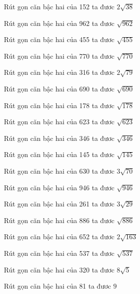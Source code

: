 \documentclass[12pt,a4paper]{article}
\begin{document}
\begin{ex}
Rút gọn căn bậc hai của 152 ta đươc $2\sqrt{38}$
\end{ex}
\begin{ex}
Rút gọn căn bậc hai của 962 ta đươc $\sqrt{962}$
\end{ex}
\begin{ex}
Rút gọn căn bậc hai của 455 ta đươc $\sqrt{455}$
\end{ex}
\begin{ex}
Rút gọn căn bậc hai của 770 ta đươc $\sqrt{770}$
\end{ex}
\begin{ex}
Rút gọn căn bậc hai của 316 ta đươc $2\sqrt{79}$
\end{ex}
\begin{ex}
Rút gọn căn bậc hai của 690 ta đươc $\sqrt{690}$
\end{ex}
\begin{ex}
Rút gọn căn bậc hai của 178 ta đươc $\sqrt{178}$
\end{ex}
\begin{ex}
Rút gọn căn bậc hai của 623 ta đươc $\sqrt{623}$
\end{ex}
\begin{ex}
Rút gọn căn bậc hai của 346 ta đươc $\sqrt{346}$
\end{ex}
\begin{ex}
Rút gọn căn bậc hai của 145 ta đươc $\sqrt{145}$
\end{ex}
\begin{ex}
Rút gọn căn bậc hai của 630 ta đươc $3\sqrt{70}$
\end{ex}
\begin{ex}
Rút gọn căn bậc hai của 946 ta đươc $\sqrt{946}$
\end{ex}
\begin{ex}
Rút gọn căn bậc hai của 261 ta đươc $3\sqrt{29}$
\end{ex}
\begin{ex}
Rút gọn căn bậc hai của 886 ta đươc $\sqrt{886}$
\end{ex}
\begin{ex}
Rút gọn căn bậc hai của 652 ta đươc $2\sqrt{163}$
\end{ex}
\begin{ex}
Rút gọn căn bậc hai của 537 ta đươc $\sqrt{537}$
\end{ex}
\begin{ex}
Rút gọn căn bậc hai của 320 ta đươc $8\sqrt{5}$
\end{ex}
\begin{ex}
Rút gọn căn bậc hai của 81 ta đươc $9$
\end{ex}
\end{document}
